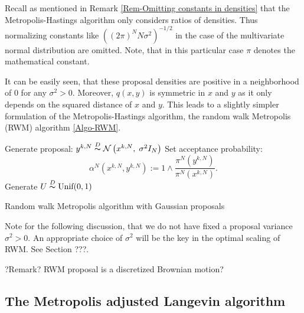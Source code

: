 Recall as mentioned in Remark \ref{Rem-Omitting constants in densities} that the Metropolis-Hastings algorithm only considers ratios of densities. Thus normalizing constants like $ \left( (2 \pi)^{N} N \sigma^2 \right)^{-1/2} $ in the case of the multivariate normal distribution are omitted. Note, that in this particular case $\pi$ denotes the mathematical constant.

It can be easily seen, that these proposal densities are positive in a neighborhood of 0 for any $ \sigma^2 > 0 $. Moreover, $ q(x,y) $ is symmetric in $x$ and $y$ as it only depends on the squared distance of $x$ and $y$. This leads to a slightly simpler formulation of the Metropolis-Hastings algorithm, the random walk Metropolis (RWM) algorithm \ref{Algo-RWM}.


\IncMargin{1em}
\begin{algorithm}
\DontPrintSemicolon


\BlankLine

{
  Generate proposal: $ y^{k,N} \stackrel{D}{\thicksim} \mathcal{N}\left(x^{k,N}, \; \sigma^2 I_N\right) $\;
  Set acceptance probability:
  \begin{equation*}
   \alpha^{N} ( x^{k,N}, y^{k,N} ) := 1 \wedge \dfrac{\pi^{N}(y^{k,N}) }{\pi^{N}(x^{k,N})}.    
  \end{equation*}\label{RWMAlgo-AcceptanceProba}
  Generate $ U \stackrel{D}{\thicksim} \text{Unif}(0,1) $\;

}
\caption{Random walk Metropolis algorithm with Gaussian proposals}\label{Algo-RWM}
\end{algorithm}\DecMargin{1em}


Note for the following discussion, that we do not have fixed a proposal variance $ \sigma^2 > 0 $. An appropriate choice of $ \sigma^2 $ will be the key in the optimal scaling of RWM. See Section ???.


?Remark? RWM proposal is a discretized Brownian motion?

 

\subsection{The Metropolis adjusted Langevin algorithm}
\label{MH-MALA}

